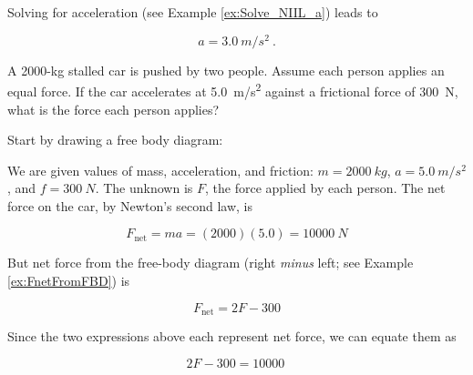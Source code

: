 \documentclass{article}
\numberwithin{equation}{section}
\numberwithin{figure}{section}
\begin{document}
Solving for acceleration (see Example \ref{ex:Solve_NIIL_a}) leads to

\begin{equation*}
    a = \SI{3.0}{m/s^2}\ .
\end{equation*}



\begin{example} \label{ex:StalledCar} 
A 2000-kg stalled car is pushed by two people. Assume each person applies an equal force. If the car accelerates at \SI{5.0}{m/s^2} against a frictional force of \SI{300}{N}, what is the force each person applies? 
\end{example}

\Solution Start by drawing a free body diagram:

\begin{figure}[h!]
    \centering
{}
\end{figure}


We are given values of mass, acceleration, and friction: $m = \SI{2000}{kg}$, $a = \SI{5.0}{m/s^2}$, and $f = \SI{300}{N}$. The unknown is $F$, the force applied by each person. The net force on the car, by Newton's second law, is

\begin{equation*}
    F_{\text{net}} = ma = (2000)(5.0) = \SI{10000}{N}
\end{equation*}

But net force from the free-body diagram (right \textit{minus} left; see Example \ref{ex:FnetFromFBD}) is

\begin{equation*}
    F_{\text{net}} = 2F - 300
\end{equation*}

Since the two expressions above each represent net force, we can equate them as

\begin{equation*}
    2F - 300 = \SI{10000}{}
\end{equation*}
\end{document}
